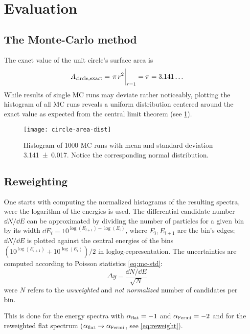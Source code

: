 \section{Evaluation}
\subsection{The Monte-Carlo method}
\label{sec:eval-circle}
The exact value of the unit circle's surface area is
\begin{equation}
    A_{\mathrm{circle,exact}}=\eval{\pi\,r^2}_{r=1}=\pi=3.141\dotso
    \label{eq:circle-area-exact}
\end{equation}
While results of single MC runs may deviate rather noticeably,
plotting the histogram of all MC runs reveals a uniform distribution
centered around the exact value as expected from the central
limit theorem (see \cref{fig:circle-area-hist}).

\begin{figure}[ht]
    \centering
    \texttt{[image: circle-area-dist]}
    \caption{Histogram of \num{1000} MC runs with mean and standard
    deviation \num{3.141(17)}. Notice the corresponding normal
distribution.}
    \label{fig:circle-area-hist}
\end{figure}

\subsection{Reweighting}
\label{sec:eval-rew}
One starts with computing the normalized histograms of the resulting spectra,
were the logarithm of the energies is used. The differential candidate number
$\dd{N}/\dd{E}$ can be approximated by dividing the number of particles for a
given bin by its width $\dd{E_i}=10^{\log(E_{i+1})-\log(E_{i})}$, where $E_{i},
E_{i+1}$ are the bin's edges; $\dd{N}/\dd{E}$ is plotted against the central
energies of the bins $\left(10^{\log(E_{i+1})}+10^{\log(E_{i})}\right)/2$ in
loglog-representation. The uncertainties are computed according to Poisson
statistics \cref{eq:mc-std}:
\begin{equation*}
    \Delta{y}=\frac{\dd{N}/\dd{E}}{\sqrt{N}}
\end{equation*}
were $N$ refers to the \emph{unweighted} and \emph{not normalized} number of
candidates per bin.

This is done for the energy spectra with $\alpha_{\mathrm{flat}}=-1$ and
$\alpha_{\mathrm{Fermi}}=-2$ and for the reweighted flat spectrum
($\alpha_{\mathrm{flat}}\to\alpha_{\mathrm{Fermi}}$, see \cref{eq:reweight}).

